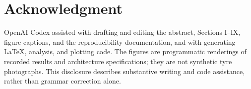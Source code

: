 \documentclass[nolineno]{ieeeaccess}
\begin{document}
\section*{Acknowledgment}
OpenAI Codex \cite{codex} assisted with drafting and editing the abstract, Sections I--IX, figure captions, and the reproducibility documentation, and with generating LaTeX, analysis, and plotting code. The figures are programmatic renderings of recorded results and architecture specifications; they are not synthetic tyre photographs. This disclosure describes substantive writing and code assistance, rather than grammar correction alone.



\EOD
\end{document}
